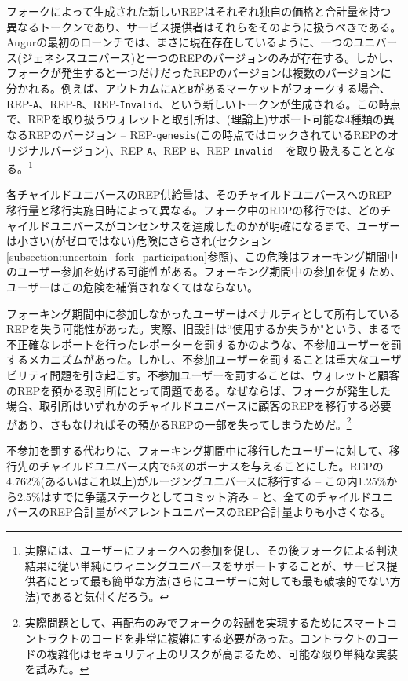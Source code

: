 \documentclass[floatfix,reprint,nofootinbib,amsmath,amssymb,epsfig,pre,floats,letterpaper,groupedaffiliation]{revtex4-1}
\theoremstyle{definition}
\theoremstyle{definition}
\theoremstyle{definition}
\begin{document}
\begin{appendix}
フォークによって生成された新しいREPはそれぞれ独自の価格と合計量を持つ異なるトークンであり、サービス提供者はそれらをそのように扱うべきである。Augurの最初のローンチでは、まさに現在存在しているように、一つのユニバース(ジェネシスユニバース)と一つのREPのバージョンのみが存在する。しかし、フォークが発生すると一つだけだったREPのバージョンは複数のバージョンに分かれる。例えば、アウトカムに\texttt{A}と\texttt{B}があるマーケットがフォークする場合、REP-\texttt{A}、REP-\texttt{B}、REP-\texttt{Invalid}、という新しいトークンが生成される。この時点で、REPを取り扱うウォレットと取引所は、(理論上)サポート可能な4種類の異なるREPのバージョン -- REP-\texttt{genesis}(この時点ではロックされているREPのオリジナルバージョン)、REP-\texttt{A}、REP-\texttt{B}、REP-\texttt{Invalid} -- を取り扱えることとなる。\footnote{実際には、ユーザーにフォークへの参加を促し、その後フォークによる判決結果に従い単純にウィニングユニバースをサポートすることが、サービス提供者にとって最も簡単な方法(さらにユーザーに対しても最も破壊的でない方法)であると気付くだろう。}

各チャイルドユニバースのREP供給量は、そのチャイルドユニバースへのREP移行量と移行実施日時によって異なる。フォーク中のREPの移行では、どのチャイルドユニバースがコンセンサスを達成したのかが明確になるまで、ユーザーは小さい(がゼロではない)危険にさらされ(セクション\ref{subsection:uncertain_fork_participation}参照)、この危険はフォーキング期間中のユーザー参加を妨げる可能性がある。フォーキング期間中の参加を促すため、ユーザーはこの危険を補償されなくてはならない。

フォーキング期間中に参加しなかったユーザーはペナルティとして所有しているREPを失う可能性があった。実際、旧設計は``使用するか失うか"という、まるで不正確なレポートを行ったレポーターを罰するかのような、不参加ユーザーを罰するメカニズムがあった。しかし、不参加ユーザーを罰することは重大なユーザビリティ問題を引き起こす。不参加ユーザーを罰することは、ウォレットと顧客のREPを預かる取引所にとって問題である。なぜならば、フォークが発生した場合、取引所はいずれかのチャイルドユニバースに顧客のREPを移行する必要があり、さもなければその預かるREPの一部を失ってしまうためだ。\footnote{実際問題として、再配布のみでフォークの報酬を実現するためにスマートコントラクトのコードを非常に複雑にする必要があった。コントラクトのコードの複雑化はセキュリティ上のリスクが高まるため、可能な限り単純な実装を試みた。}

不参加を罰する代わりに、フォーキング期間中に移行したユーザーに対して、移行先のチャイルドユニバース内で5\%のボーナスを与えることにした。REPの4.762\%(あるいはこれ以上)がルージングユニバースに移行する -- この内1.25\%から2.5\%はすでに争議ステークとしてコミット済み -- と、全てのチャイルドユニバースのREP合計量がペアレントユニバースのREP合計量よりも小さくなる。

\end{appendix}
\end{document}
